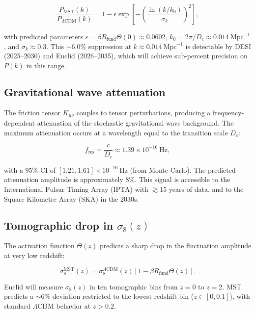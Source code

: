 \documentclass[12pt,a4paper]{article}
\theoremstyle{plain}
\theoremstyle{definition}
\theoremstyle{remark}
\begin{document}
\begin{equation}
\frac{P_{\text{MST}}(k)}{P_{\Lambda\text{CDM}}(k)} = 1 - \epsilon \exp\left[-\left(\frac{\ln(k/k_0)}{\sigma_k}\right)^2\right],
\label{eq:Pk}
\end{equation}

with predicted parameters \(\epsilon = \beta R_{\text{fund}} \Theta(0) \approx 0.0602\), \(k_0 = 2\pi/D_c \approx 0.014\ \text{Mpc}^{-1}\), and \(\sigma_k \approx 0.3\). This \(\sim6.0\%\) suppression at \(k \approx 0.014\ \text{Mpc}^{-1}\) is detectable by DESI (2025--2030) and Euclid (2026--2035), which will achieve sub-percent precision on \(P(k)\) in this range.

\subsection{Gravitational wave attenuation}
The friction tensor \(K_{\mu\nu}\) couples to tensor perturbations, producing a frequency-dependent attenuation of the stochastic gravitational wave background. The maximum attenuation occurs at a wavelength equal to the transition scale \(D_c\):

\begin{equation}
f_{\text{res}} = \frac{c}{D_c} \approx 1.39 \times 10^{-16}\ \text{Hz},
\label{eq:GWfreq}
\end{equation}

with a 95\% CI of \([1.21, 1.61] \times 10^{-16}\ \text{Hz}\) (from Monte Carlo). The predicted attenuation amplitude is approximately \(8\%\). This signal is accessible to the International Pulsar Timing Array (IPTA) with \(\gtrsim15\) years of data, and to the Square Kilometre Array (SKA) in the 2030s.

\subsection{Tomographic drop in \(\sigma_8(z)\)}
The activation function \(\Theta(z)\) predicts a sharp drop in the fluctuation amplitude at very low redshift:

\begin{equation}
\sigma_8^{\text{MST}}(z) = \sigma_8^{\Lambda\text{CDM}}(z)\left[1 - \beta R_{\text{fund}} \Theta(z)\right].
\label{eq:sigma8z}
\end{equation}

Euclid will measure \(\sigma_8(z)\) in ten tomographic bins from \(z=0\) to \(z=2\). MST predicts a \(\sim6\%\) deviation restricted to the lowest redshift bin (\(z \in [0,0.1]\)), with standard \(\Lambda\)CDM behavior at \(z > 0.2\).
\end{document}

